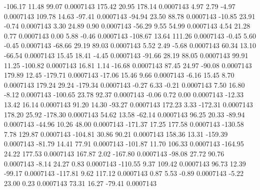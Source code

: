      -106.17       11.48       99.07     0.0007143
      175.42       20.95      178.14     0.0007143
        4.97        2.79       -4.97     0.0007143
      109.78       14.63      -97.41     0.0007143
      -94.94       23.50       88.78     0.0007143
      -10.85       23.91       -0.74     0.0007143
        3.30       24.89        0.90     0.0007143
      -56.29        9.55       54.99     0.0007143
        4.54       21.28        0.77     0.0007143
        0.00        5.88       -0.46     0.0007143
     -108.67       13.64      111.26     0.0007143
       -0.45        5.60       -0.45     0.0007143
      -68.66       29.19       89.03     0.0007143
        5.52        2.49       -5.68     0.0007143
       60.34       13.10      -66.54     0.0007143
       15.45       18.41       -4.45     0.0007143
      -91.66       28.19       88.05     0.0007143
       99.91       11.25     -100.82     0.0007143
       16.81        1.14      -16.68     0.0007143
       87.45       24.97      -90.08     0.0007143
      179.89       12.45     -179.71     0.0007143
      -17.06       15.46        9.66     0.0007143
       -6.16       15.45        8.70     0.0007143
      179.24       29.24     -179.34     0.0007143
       -0.27        6.33       -0.21     0.0007143
        7.50       16.80       -8.12     0.0007143
     -100.65       23.78       92.37     0.0007143
       -0.06        0.72        0.00     0.0007143
      -12.33       13.42       16.14     0.0007143
       91.20       14.30      -93.27     0.0007143
      172.23        3.33     -172.31     0.0007143
      178.20       25.92     -178.30     0.0007143
       54.62       13.58      -62.14     0.0007143
       96.25       20.33      -89.94     0.0007143
      -44.96       10.26       48.00     0.0007143
     -171.37       17.25      177.58     0.0007143
     -130.58        7.78      129.87     0.0007143
     -104.81       30.86       90.21     0.0007143
      158.36       13.31     -159.39     0.0007143
      -81.79       14.41       77.91     0.0007143
     -101.87       11.70      106.33     0.0007143
     -164.95       24.22      177.53     0.0007143
      167.87        2.02     -167.80     0.0007143
      -98.08       27.72       90.76     0.0007143
       -8.14       24.27        0.83     0.0007143
     -110.55        9.37      109.42     0.0007143
       96.73       12.39      -99.17     0.0007143
     -117.81        9.62      117.12     0.0007143
        0.87        5.53       -0.89     0.0007143
       -5.22       23.00        0.23     0.0007143
       73.31       16.27      -79.41     0.0007143
